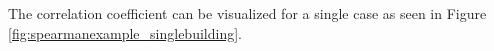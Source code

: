The correlation coefficient can be visualized for a single case as seen in Figure \ref{fig:spearmanexample_singlebuilding}.